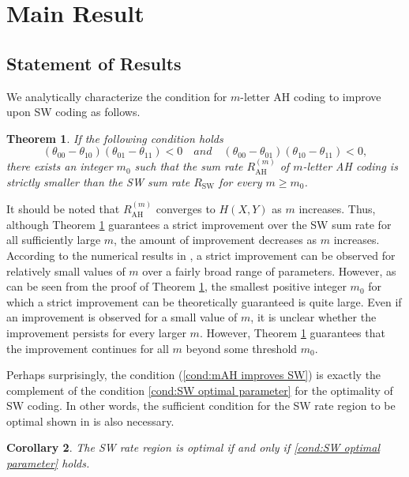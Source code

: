 \documentclass[journal,onecolumn]{IEEEtran}
\newtheorem{theorem}{Theorem}
\newtheorem{corollary}[theorem]{Corollary}
\theoremstyle{definition}
\theoremstyle{remark}
\begin{document}
\section{Main Result}
\subsection{Statement of Results}
    We analytically characterize the condition for $m$-letter AH coding to improve upon SW coding as follows. 
    \begin{theorem}\label{thm:main}
        If the following condition holds
        \begin{equation}\label{cond:mAH improves SW}
            (\theta_{00}-\theta_{10})(\theta_{01}-\theta_{11}) < 0 \quad and \quad (\theta_{00}-\theta_{01})(\theta_{10}-\theta_{11}) < 0,
        \end{equation}
        there exists an integer $m_0$ such that the sum rate $R^{(m)}_{\mathrm{AH}}$ 
        of $m$-letter AH coding is strictly smaller than 
        the SW sum rate $R_{\mathrm{SW}}$ for every $m\geq m_0$.
    \end{theorem}

    It should be noted that $R_{\mathrm{AH}}^{(m)}$ converges to $H(X,Y)$ as $m$ increases.
    Thus, although Theorem \ref{thm:main} guarantees a strict improvement over the SW sum rate
    for all sufficiently large $m$, the amount of improvement decreases as $m$ increases.
    According to the numerical results in \cite{KW}, a strict improvement can be
    observed for relatively small values of $m$ over a fairly broad range of parameters.
    However, as can be seen from the proof of Theorem \ref{thm:main}, 
    the smallest positive integer $m_0$ for which a strict improvement 
    can be theoretically guaranteed is quite large.
    Even if an improvement is observed for a small value of $m$,
    it is unclear whether the improvement persists for every larger $m$.
    However, Theorem \ref{thm:main} guarantees that the improvement continues 
    for all $m$ beyond some threshold $m_0$.

    Perhaps surprisingly, the condition (\ref{cond:mAH improves SW}) is exactly the complement of the condition \eqref{cond:SW optimal parameter} for the optimality of SW coding.
    In other words, the sufficient condition for the SW rate region to be optimal shown in \cite[Ex 16.23]{Csiszár_Körner_2011} is also necessary.
    \begin{corollary}\label{cor:optimality}
        The SW rate region is optimal if and only if \eqref{cond:SW optimal parameter} holds.
    \end{corollary}
    
\end{document}
